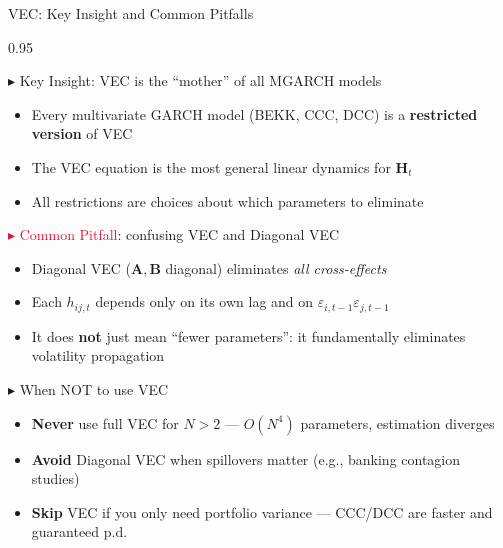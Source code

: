 \documentclass[9pt, aspectratio=169, t]{beamer}
\begin{document}
\begin{frame}{VEC: Key Insight and Common Pitfalls}
    \begin{cminipage}{0.95\textwidth}
    \vspace{-2mm}
    {\scriptsize
    \begin{block}{\textcolor{MainBlue}{$\blacktriangleright$ Key Insight}: VEC is the ``mother'' of all MGARCH models}
        \begin{itemize}\setlength{\itemsep}{0pt}
            \item Every multivariate GARCH model (BEKK, CCC, DCC) is a \textbf{restricted version} of VEC
            \item The VEC equation is the most general linear dynamics for $\mathbf{H}_t$
            \item All restrictions are choices about which parameters to eliminate
        \end{itemize}
    \end{block}
    \vspace{-2mm}
    \begin{alertblock}{\textcolor{Crimson}{$\blacktriangleright$ Common Pitfall}: confusing VEC and Diagonal VEC}
        \begin{itemize}\setlength{\itemsep}{0pt}
            \item Diagonal VEC ($\mathbf{A}, \mathbf{B}$ diagonal) eliminates \textit{all cross-effects}
            \item Each $h_{ij,t}$ depends only on its own lag and on $\varepsilon_{i,t-1}\varepsilon_{j,t-1}$
            \item It does \textbf{not} just mean ``fewer parameters'': it fundamentally eliminates volatility propagation
        \end{itemize}
    \end{alertblock}
    \vspace{-2mm}
    \begin{exampleblock}{\textcolor{Forest}{$\blacktriangleright$ When NOT to use VEC}}
        \begin{itemize}\setlength{\itemsep}{0pt}
            \item \textbf{Never} use full VEC for $N > 2$ --- $O(N^4)$ parameters, estimation diverges
            \item \textbf{Avoid} Diagonal VEC when spillovers matter (e.g., banking contagion studies)
            \item \textbf{Skip} VEC if you only need portfolio variance --- CCC/DCC are faster and guaranteed p.d.
        \end{itemize}
    \end{exampleblock}
    }
    \end{cminipage}
\end{frame}
\end{document}
